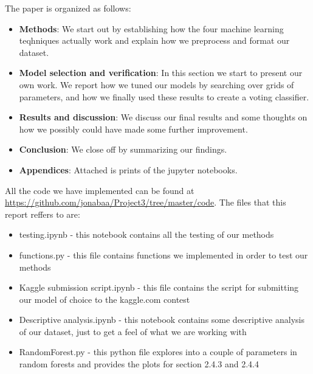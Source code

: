 \documentclass[parskip=half]{scrartcl}
\theoremstyle{definition}
\theoremstyle{remark}
\begin{document}
The paper is organized as follows: 
\begin{itemize}
    \item
        \textbf{Methods}: 
        We start out by establishing how the four machine learning 
        teqhniques actually work and explain how we preprocess and
        format our dataset.
    \item
        \textbf{Model selection and verification}:
        In this section we start to present our own work.
        We report how we tuned our models by searching
        over grids of parameters, and how
        we finally used these results to create a voting classifier.
    \item
        \textbf{Results and discussion}:
        We discuss our final results and some thoughts on how we possibly
        could have made some further improvement.
    \item
        \textbf{Conclusion}:
        We close off by summarizing our findings.
    \item
        \textbf{Appendices}:
        Attached is prints of the jupyter notebooks. 
\end{itemize}

\begin{framed}
All the code we have implemented can be found at \url{https://github.com/jonabaa/Project3/tree/master/code}. The files that this report reffers to
are:
    \begin{itemize}
        \item
            testing.ipynb - this notebook 
            contains all the testing of our methods
        \item
            functions.py - this file contains functions we implemented in
            order to test our methods
        \item
            Kaggle submission script.ipynb - this file contains the script
            for submitting our model of choice to the kaggle.com contest
        \item
            Descriptive analysis.ipynb - this notebook contains some 
            descriptive analysis of our dataset, just to get a feel of
            what we are working with
        \item
        	RandomForest.py - this python file explores into a couple of parameters in random forests and provides the plots for section 2.4.3 and 2.4.4
    \end{itemize}
\end{framed}
\end{document}
